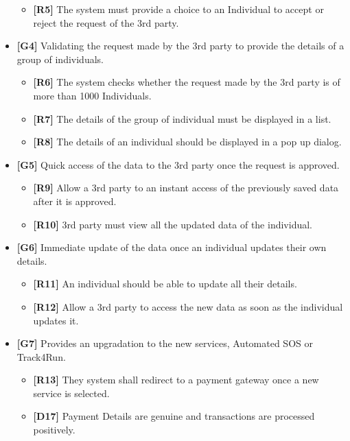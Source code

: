 \begin{itemize}
\begin{itemize}
\item\textbf{[R5]} The system must provide a choice to an Individual to accept or reject the request of the 3rd party.\newline
\end{itemize}
\item\textbf{[G4]} Validating the request made by the 3rd party to provide the details of a group of individuals.
\begin{itemize}
\item\textbf{[R6]} The system checks whether the request made by the 3rd party is of more than 1000 Individuals.
\item\textbf{[R7]} The details of the group of individual must be displayed in a list.
\item\textbf{[R8]} The details of an individual should be displayed in a pop up dialog.\newline
\end{itemize}

\item\textbf{[G5]} Quick access of the data to the 3rd party once the request is approved.

\begin{itemize}
\item\textbf{[R9]} Allow a 3rd party to an instant access of the previously saved data after it is approved.
\item\textbf{[R10]} 3rd party must view all the updated data of the individual. \newline
\end{itemize}

\item\textbf{[G6]} Immediate update of the data once an individual updates their own details.

\begin{itemize}
\item\textbf{[R11]} An individual should be able to update all their details.
\item\textbf{[R12]} Allow a 3rd party to access the new data as soon as the individual updates it.\newline

\end{itemize}

\item\textbf{[G7]}  Provides an upgradation to the new services, Automated SOS or Track4Run.

\begin{itemize}
\item\textbf{[R13]} They system shall redirect to a payment gateway once a new service is selected.
\item\textbf{[D17]} Payment Details are genuine and transactions are processed positively.\newline
\end{itemize}


\end{itemize}
